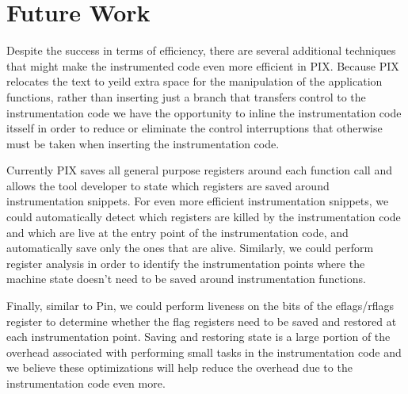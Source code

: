 \section{Future Work}

Despite the success in terms of efficiency, there are several additional techniques
that might make the instrumented code even more efficient in PIX. Because PIX relocates
the text to yeild extra space for the manipulation of the application functions, 
rather than inserting just a branch
that transfers control to the instrumentation code we have the opportunity to inline
the instrumentation code itsself
in order to reduce or eliminate the control interruptions  that otherwise must be taken 
when inserting the instrumentation code.

Currently PIX saves all general purpose registers around each function call and allows the
tool developer to state which registers are saved around instrumentation snippets. For even more efficient instrumentation
snippets, we could automatically detect which registers are killed by the instrumentation code and which are live at the entry point
of the instrumentation code, and automatically save only the ones that are alive. Similarly, we could perform register 
analysis in order to identify the instrumentation points where the machine state doesn't need to be saved around instrumentation functions. 

Finally, similar to Pin, we could perform liveness on the bits of the eflags/rflags register to determine whether the flag registers need to be saved and
restored at each instrumentation point. Saving and restoring state is a large portion of the overhead associated with performing
small tasks in the instrumentation code and we believe these optimizations will help reduce the overhead due to the instrumentation code even more.


